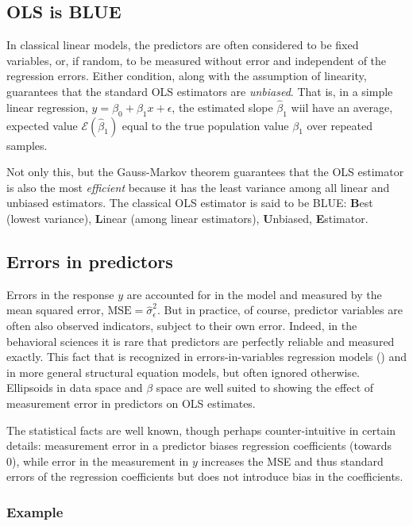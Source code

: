 \documentclass[
  letterpaper,
  10pt,
  krantz2]{krantz}
\begin{document}
\subsection{OLS is BLUE}\label{ols-is-blue}

In classical linear models, the predictors are often considered to be
fixed variables, or, if random, to be measured without error and
independent of the regression errors. Either condition, along with the
assumption of linearity, guarantees that the standard OLS estimators are
\emph{unbiased}. That is, in a simple linear regression,
\(y = \beta_0 + \beta_1 x + \epsilon\), the estimated slope
\(\hat{\beta}_1\) wiil have an average, expected value
\(\mathcal{E} (\hat{\beta}_1)\) equal to the true population value
\(\beta_1\) over repeated samples.

Not only this, but the Gauss-Markov theorem guarantees that the OLS
estimator is also the most \emph{efficient} because it has the least
variance among all linear and unbiased estimators. The classical OLS
estimator is said to be BLUE: \textbf{B}est (lowest variance),
\textbf{L}inear (among linear estimators), \textbf{U}nbiased,
\textbf{E}stimator.

\subsection{Errors in predictors}\label{errors-in-predictors}

Errors in the response \(y\) are accounted for in the model and measured
by the mean squared error, \(\text{MSE} = \hat{\sigma}_\epsilon^2\). But
in practice, of course, predictor variables are often also observed
indicators, subject to their own error. Indeed, in the behavioral
sciences it is rare that predictors are perfectly reliable and measured
exactly. This fact that is recognized in errors-in-variables regression
models () and in more general
structural equation models, but often ignored otherwise. Ellipsoids in
data space and \(\beta\) space are well suited to showing the effect of
measurement error in predictors on OLS estimates.

The statistical facts are well known, though perhaps counter-intuitive
in certain details: measurement error in a predictor biases regression
coefficients (towards 0), while error in the measurement in \(y\)
increases the MSE and thus standard errors of the regression
coefficients but does not introduce bias in the coefficients.

\subsubsection{Example}\label{example}
\end{document}
